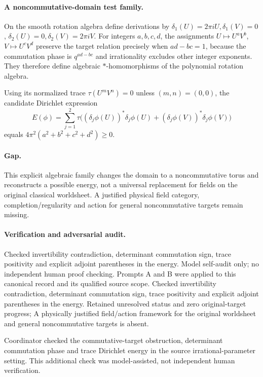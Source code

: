 \documentclass[11pt]{article}
\begin{document}
\paragraph{A noncommutative-domain test family.} On the smooth rotation algebra define derivations by $\delta_1(U)=2\pi iU,\delta_1(V)=0$, $\delta_2(U)=0,\delta_2(V)=2\pi iV$. For integers $a,b,c,d$, the assignments $U\mapsto U^aV^b$, $V\mapsto U^cV^d$ preserve the target relation precisely when $ad-bc=1$, because the commutation phase is $q^{ad-bc}$ and irrationality excludes other integer exponents. They therefore define algebraic $*$-homomorphisms of the polynomial rotation algebra.

Using its normalized trace $\tau(U^mV^n)=0$ unless $(m,n)=(0,0)$, the candidate Dirichlet expression
\[
 E(\phi)=\sum_{j=1}^2\tau\bigl((\delta_j\phi(U))^*\delta_j\phi(U)+(\delta_j\phi(V))^*\delta_j\phi(V)\bigr)
\]
equals $4\pi^2(a^2+b^2+c^2+d^2)\geq0$.

\paragraph{Gap.} This explicit algebraic family changes the domain to a noncommutative torus and reconstructs a possible energy, not a universal replacement for fields on the original classical worldsheet. A justified physical field category, completion/regularity and action for general noncommutative targets remain missing.

\paragraph{Verification and adversarial audit.}
Checked invertibility contradiction, determinant commutation sign, trace positivity and explicit adjoint parentheses in the energy. Model self-audit only; no independent human proof checking. Prompts A and B were applied to this canonical record and its qualified source scope. Checked invertibility contradiction, determinant commutation sign, trace positivity and explicit adjoint parentheses in the energy. Retained unresolved status and zero original-target progress; A physically justified field/action framework for the original worldsheet and general noncommutative targets is absent.

Coordinator checked the commutative-target obstruction, determinant commutation phase and trace Dirichlet energy in the source irrational-parameter setting. This additional check was model-assisted, not independent human verification.
\end{document}
